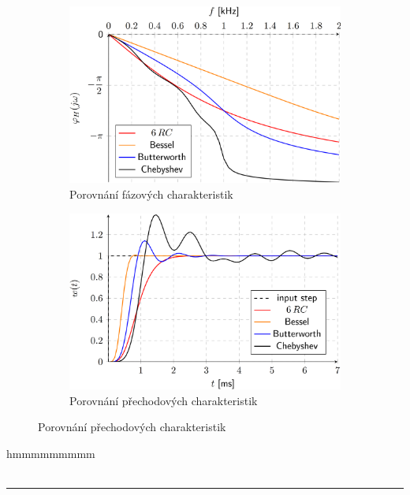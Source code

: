 \documentclass[a4paper,12pt]{article}   %
\begin{document}
\begin{figure}[H]
    \centering
    \begin{subfigure}{.49\textwidth}
        \centering
        \includegraphics[width=\textwidth]{faze-porovnani.PNG}
        \caption{Porovnání fázových charakteristik}
        \label{graf:faze:porovnani}
    \end{subfigure}
    \begin{subfigure}{.49\textwidth}
        \centering
        \includegraphics[width=\textwidth]{prechod-porovnani.PNG}
        \caption{Porovnání přechodových charakteristik}
        \label{graf:prechod:porovnani}
    \end{subfigure}
\end{figure}
hmmmmmmmmm\\
 \\
\hrule%
\newpage
\end{document}
